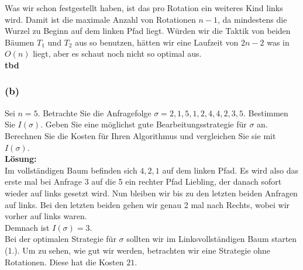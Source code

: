 \documentclass[11pt,a4paper,ngerman]{article}
\begin{document}
Was wir schon festgestellt haben, ist das pro Rotation ein weiteres Kind links wird. Damit ist die maximale Anzahl von Rotationen $n-1$, da mindestens die Wurzel zu Beginn auf dem linken Pfad liegt. Würden wir die Taktik von beiden Bäumen $T_1$ und $T_2$ aus so benutzen, hätten wir eine Laufzeit von $2n-2$ was in $O(n)$ liegt, aber es schaut noch nicht so optimal aus.\\

\textbf{tbd}

\subsubsection*{(b)}

Sei $n=5$. Betrachte Sie die Anfragefolge $\sigma = 2,1,5,1,2,4,4,2,3,5$. Bestimmen Sie $I(\sigma)$. Geben Sie eine möglichst gute Bearbeitungsstrategie für $\sigma$ an. Berechnen Sie die Kosten für Ihren Algorithmus und vergleichen Sie sie mit $I(\sigma)$.\\

\noindent\textbf{Lösung:}\\

Im vollständigen Baum befinden sich $4,2,1$ auf dem linken Pfad. Es wird also das erste mal bei Anfrage $3$ auf die 5 ein rechter Pfad Liebling, der danach sofort wieder auf links gesetzt wird. Nun bleiben wir bis zu den letzten beiden Anfragen auf links. Bei den letzten beiden gehen wir genau 2 mal nach Rechts, wobei wir vorher auf links waren.\\

Demnach ist $I(\sigma) = 3$.\\

Bei der optimalen Strategie für $\sigma$ sollten wir im Linksvollständigen Baum starten (1.). Um zu sehen, wie gut wir werden,
betrachten wir eine Strategie ohne Rotationen. Diese hat die Kosten $21$.
\end{document}
